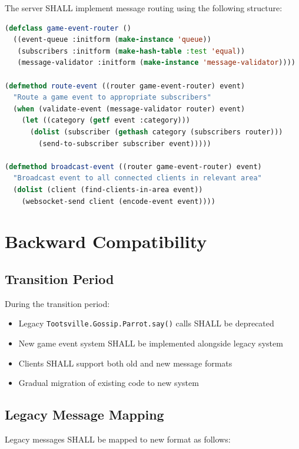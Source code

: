 \documentclass[12pt,a4paper]{article}
\begin{document}
The server SHALL implement message routing using the following structure:

\begin{lstlisting}[language=Lisp, caption=Server Event Router]
(defclass game-event-router ()
  ((event-queue :initform (make-instance 'queue))
   (subscribers :initform (make-hash-table :test 'equal))
   (message-validator :initform (make-instance 'message-validator))))

(defmethod route-event ((router game-event-router) event)
  "Route a game event to appropriate subscribers"
  (when (validate-event (message-validator router) event)
    (let ((category (getf event :category)))
      (dolist (subscriber (gethash category (subscribers router)))
        (send-to-subscriber subscriber event)))))

(defmethod broadcast-event ((router game-event-router) event)
  "Broadcast event to all connected clients in relevant area"
  (dolist (client (find-clients-in-area event))
    (websocket-send client (encode-event event))))
\end{lstlisting}

\section{Backward Compatibility}

\subsection{Transition Period}

During the transition period:

\begin{itemize}
\item Legacy \texttt{Tootsville.Gossip.Parrot.say()} calls SHALL be deprecated
\item New game event system SHALL be implemented alongside legacy system
\item Clients SHALL support both old and new message formats
\item Gradual migration of existing code to new system
\end{itemize}

\subsection{Legacy Message Mapping}

Legacy messages SHALL be mapped to new format as follows:
\end{document}
